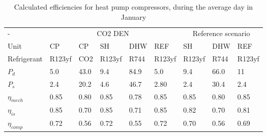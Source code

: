 \begin{table}[h!]
	\centering
	\caption{Calculated efficiencies for heat pump compressors, during the average day in January}\vspace{2mm}
	\label{tab:eta_comp} 
\begin{tabular}{l@{\hskip 0.5in}lllll@{\hskip 0.5in}lll} \toprule
	-             & \multicolumn{5}{c}{CO2 DEN}            & \multicolumn{3}{c}{Reference scenario} \\
	Unit          & CP     & CP   & SH     & DHW  & REF    & SH           & DHW       & REF         \\
	Refrigerant   & R123yf & CO2  & R123yf & R744 & R123yf & R123yf       & R744      & R123yf      \\ \midrule
	$P_{d}$       & 5.0    & 43.0 & 9.4    & 84.9 & 5.0    & 9.4          & 66.0      & 11          \\
	$P_{s}$       & 2.4    & 20.2 & 4.6    & 46.7 & 2.80   & 2.4          & 30.4      & 2.4         \\
	$\eta_{mech}$ & 0.85   & 0.80 & 0.85   & 0.78 & 0.85   & 0.85         & 0.80      & 0.85        \\
	$\eta_{is}$   & 0.85   & 0.70 & 0.85   & 0.71 & 0.85   & 0.82         & 0.70      & 0.81        \\
	$\eta_{comp}$ & 0.72   & 0.56 & 0.72   & 0.55 & 0.72   & 0.70         & 0.56      & 0.69       \\ \bottomrule
\end{tabular}
\end{table}